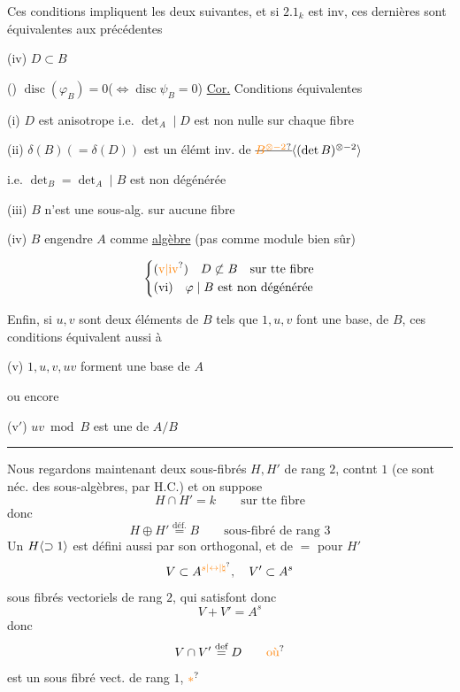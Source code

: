Ces  conditions impliquent les deux suivantes, et si $2.1_k$ est inv,  ces dernières sont équivalentes aux précédentes

(iv) $D\subset B$

()  $\operatorname{disc}(\varphi_B)=0$\qquad ($\Longleftrightarrow\operatorname{disc}\psi_B=0$)
\uline{Cor.} Conditions équivalentes

(i) $D$ est anisotrope i.e. $\det_A\mid D$ est non nulle sur chaque fibre

(ii) $\delta(B)(=\delta(D))$ est un élémt inv. de $\deleted{\unsure{B^{\otimes-2}}}\inserted{(\det B)^{\otimes-2}}$


i.e. $\det_B=\det_A\mid B$ est non dégénérée

(iii) $B$ n'est une sous-alg. sur aucune fibre

(iv) $B$ engendre $A$ comme \uline{algèbre} (pas comme module bien sûr)

\[
\left\{\begin{aligned}
&(\mathrm{\unsure{v|iv}})\quad D\not\subset B\quad\text{sur tte fibre}\\
&(\mathrm{vi})\quad\varphi\mid B\text{ est non dégénérée}
\end{aligned}\right.
\]

Enfin, si $u,v$ sont deux éléments de $B$ tels que $1,u,v$ font une base, de $B$, ces conditions équivalent aussi à

(v) $1,u,v,uv$ forment une base de $A$

ou encore

(v$'$) $uv\bmod B$ est une   de $A/B$

\begin{center}\rule{1.5cm}{0.35pt}\end{center}


Nous regardons maintenant deux sous-fibrés   $H,H'$ de rang $2$, contnt $1$ (ce sont néc. des sous-algèbres, par H.C.) et on suppose
\[
H\cap H'=k\qquad\text{sur tte fibre}
\]
donc
\[
H\oplus H'\overset{\text{déf.}}{=}B\qquad\text{sous-fibré de rang }3
\]
 Un $H\inserted{\supset1}$ est défini aussi par son orthogonal, et de $=$ pour $H'$
\[
V\subset A^{\unsure{s|\leftrightarrow|\natural}},\quad V'\subset A^s
\]
sous fibrés vectoriels de rang $2$, qui satisfont donc
\[
V+V'=A^s
\]
donc
\[
V\cap V'\overset{\text{def}}{=}D\qquad\unsure{\text{où}}
\]
est un sous fibré vect. de rang $1$, $\unsure{*}$

